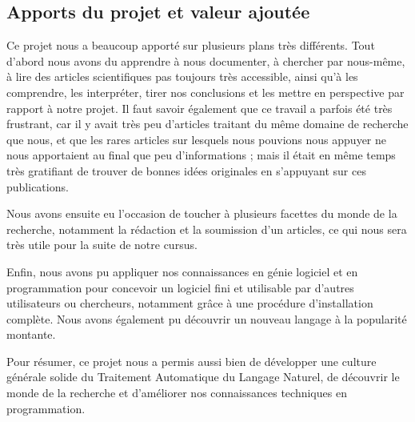 \documentclass[10pt,a4paper]{article}
\begin{document}
\subsection{Apports du projet et valeur ajoutée}
\par Ce projet nous a beaucoup apporté sur plusieurs plans très différents. Tout d'abord nous avons du apprendre à nous documenter, à chercher par nous-même, à lire des articles scientifiques pas toujours très accessible, ainsi qu'à les comprendre, les interpréter, tirer nos conclusions et les mettre en perspective par rapport à notre projet. Il faut savoir également que ce travail a parfois été très frustrant, car il y avait très peu d'articles traitant du même domaine de recherche que nous, et que les rares articles sur lesquels nous pouvions nous appuyer ne nous apportaient au final que peu d'informations ; mais il était en même temps très gratifiant de trouver de bonnes idées originales en s'appuyant sur ces publications.
\par Nous avons ensuite eu l'occasion de toucher à plusieurs facettes du monde de la recherche, notamment la rédaction et la soumission d'un articles, ce qui nous sera très utile pour la suite de notre cursus. 
\par Enfin, nous avons pu appliquer nos connaissances en génie logiciel et en programmation pour concevoir un logiciel fini et utilisable par d'autres utilisateurs ou chercheurs, notamment grâce à une procédure d'installation complète. Nous avons également pu découvrir un nouveau langage à la popularité montante.
\par Pour résumer, ce projet nous a permis aussi bien de développer une culture générale solide du Traitement Automatique du Langage Naturel, de découvrir le monde de la recherche et d'améliorer nos connaissances techniques en programmation.
\end{document}

